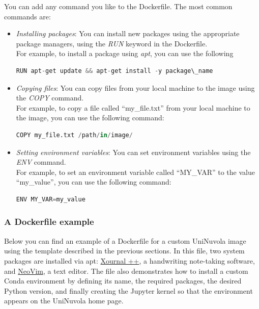 You can add any command you like to the Dockerfile. The most common commands
are:
\begin{itemize}
  \item \textit{Installing packages}: You can install new packages using the
        appropriate package managers, using the \textit{RUN} keyword in the Dockerfile. \\
        For example, to install a package using \textit{apt}, you can use the following

        \begin{lstlisting}[language=python]
  RUN apt-get update && apt-get install -y package\_name
\end{lstlisting}

  \item \textit{Copying files}: You can copy files from your local machine to the
        image using the \textit{COPY} command. \\
        For example, to copy a file called ``my\_file.txt'' from your local machine
        to the image, you can use the following command:
        \begin{lstlisting}[language=python]
  COPY my_file.txt /path/in/image/
\end{lstlisting}

  \item \textit{Setting environment variables}: You can set environment
        variables using the \textit{ENV} command. \\
        For example, to set an environment variable called ``MY\_VAR'' to the value
        ``my\_value'', you can use the following command:
        \begin{lstlisting}[language=python]
  ENV MY_VAR=my_value
\end{lstlisting}

\end{itemize}


\subsubsection{A Dockerfile example}

Below you can find an example of a Dockerfile for a custom UniNuvola image using
the template described in the previous sections. In this file, two system
packages are installed via apt:
\href{https://github.com/xournalpp/xournalpp}{Xournal ++}, a handwriting
note-taking software, and \href{https://github.com/neovim/neovim}{NeoVim}, a
text editor. The file also demonstrates how to install a custom Conda
environment by defining its name, the required packages, the desired Python
version, and finally creating the Jupyter kernel so that the environment appears
on the UniNuvola home page.

